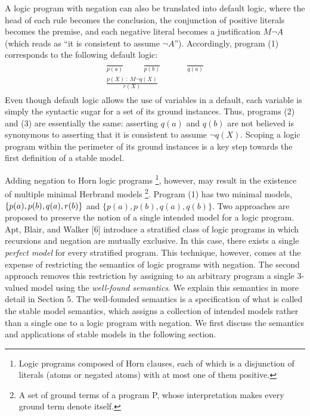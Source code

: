 A logic program with negation can also be translated into default logic, where the head 
of each rule becomes the conclusion, the conjunction of positive literals becomes the premise, 
and each negative literal becomes a justification $M \neg A$ (which reads as ``it is consistent to assume $\neg A$''). 
Accordingly, program (1) corresponds to the following default logic:
\begin{align}
    \begin{split}
        \frac{}{p(a)} \hspace{1cm} \frac{}{p(b)} \hspace{1cm} &\frac{}{q(a)} \\ 
        \frac{p(X) \: : \: M \neg q(X)}{r(X)}&
    \end{split}
\end{align}
Even though default logic allows the use of variables in a default, each variable is simply 
the syntactic sugar for a set of its ground instances. Thus, programs (2) and (3) are essentially 
the same: asserting $q(a)$ and $q(b)$ are not believed is synonymous to asserting that it is consistent to assume 
$\neg q(X)$. Scoping a logic program within the perimeter of its ground instances is a key step 
towards the first definition of a stable model. 

Adding negation to Horn logic programs \footnote{Logic programs composed of Horn clauses, 
each of which is a disjunction of literals (atoms or negated atoms) with at most one of 
them positive.}, however, may result in the existence of multiple minimal 
Herbrand models \footnote{A set of ground terms of a program P, whose interpretation 
makes every ground term denote itself.}. 
Program (1) has two minimal models, $\{p(a),p(b),\\q(a),r(b)\}$ and $\{p(a),p(b),q(a),q(b)\}$.
Two approaches are proposed to preserve the notion of a single intended model for a logic program. 
Apt, Blair, and Walker [6] introduce a stratified class of logic programs in which recursions and negation are 
mutually exclusive. In this case, there exists a single \emph{perfect model} for every stratified program. 
This technique, however, comes at the expense of restricting the semantics of logic programs with negation. 
The second approach removes this restriction by assigning to an arbitrary program a single 3-valued 
model using the \emph{well-found semantics}. We explain this semantics in more detail in Section 5. The 
well-founded semantics is a specification of what is called the stable model semantics, which 
assigns a collection of intended models rather than a single one to a logic program with negation. 
We first discuss the semantics and applications of stable models in the following section. 